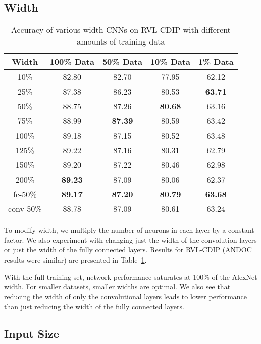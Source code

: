 \documentclass[10pt, conference, compsocconf]{IEEEtran}
\newcommand{\squeezeup}{\vspace{-2.5mm}}
\begin{document}
\subsection{Width}

\begin{table}

\centering
\begin{tabular}{c|c|c|c|c}
Width & 100\% Data & 50\% Data & 10\% Data & 1\% Data  \\
\hline
10\%     & 82.80          & 82.70          & 77.95          & 62.12 \\
25\%     & 87.38          & 86.23          & 80.53          & \textbf{63.71} \\
50\%     & 88.75          & 87.26          & \textbf{80.68} & 63.16 \\
75\%     & 88.99          & \textbf{87.39} & 80.59 & 63.42 \\
100\%    & 89.18 & 87.15          & 80.52          & 63.48 \\
125\%    & 89.22 & 87.16          & 80.31          & 62.79 \\
150\%    & 89.20 & 87.22          & 80.46          & 62.98 \\
200\%    & \textbf{89.23} & 87.09          & 80.06          & 62.37 \\
\hline
fc-50\%  & \textbf{89.17} & \textbf{87.20} & \textbf{80.79} & \textbf{63.68} \\
conv-50\%& 88.78          & 87.09          & 80.61          & 63.24 \\
\end{tabular}

\caption{Accuracy of various width CNNs on RVL-CDIP with different amounts of training data}
\label{tab:width}
\squeezeup
\squeezeup
\end{table}

To modify width, we multiply the number of neurons in each layer by a constant factor.
We also experiment with changing just the width of the convolution layers or just the width of the fully connected layers.
Results for RVL-CDIP (ANDOC results were similar) are presented in Table~\ref{tab:width}.

With the full training set, network performance saturates at 100\% of the AlexNet width.
For smaller datasets, smaller widths are optimal.
We also see that reducing the width of only the convolutional layers leads to lower performance than just reducing the width of the fully connected layers.


\subsection{Input Size}
\end{document}
